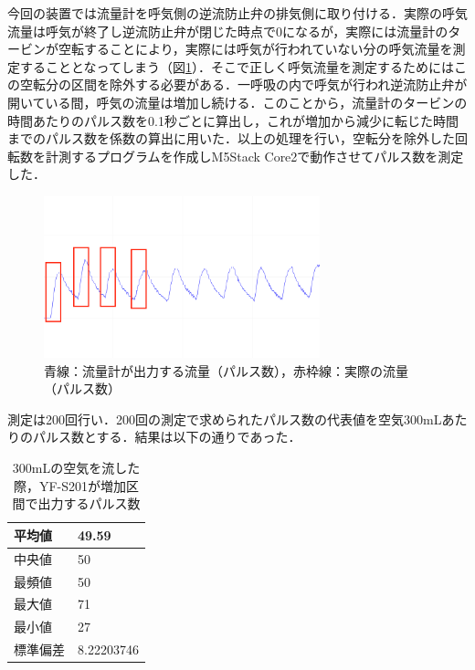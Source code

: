 今回の装置では流量計を呼気側の逆流防止弁の排気側に取り付ける．実際の呼気流量は呼気が終了し逆流防止弁が閉じた時点で0になるが，実際には流量計のタービンが空転することにより，実際には呼気が行われていない分の呼気流量を測定することとなってしまう（図\ref{fig:flowsensor_increased_section}）．そこで正しく呼気流量を測定するためにはこの空転分の区間を除外する必要がある．一呼吸の内で呼気が行われ逆流防止弁が開いている間，呼気の流量は増加し続ける．このことから，流量計のタービンの時間あたりのパルス数を0.1秒ごとに算出し，これが増加から減少に転じた時間までのパルス数を係数の算出に用いた．以上の処理を行い，空転分を除外した回転数を計測するプログラムを作成しM5Stack Core2で動作させてパルス数を測定した．

\begin{figure}[H]
  \begin{center}
    \includegraphics[width=8cm]{fig/flowsensor_increased_section}
    \caption{青線：流量計が出力する流量（パルス数），赤枠線：実際の流量（パルス数）}
    \label{fig:flowsensor_increased_section}
  \end{center}
\end{figure}

測定は200回行い．200回の測定で求められたパルス数の代表値を空気300mLあたりのパルス数とする．結果は以下の通りであった．

\begin{table}[H]
\begin{center}
\caption{300mLの空気を流した際，YF-S201が増加区間で出力するパルス数}
\label{tb:flowsensor_result}
\begin{tabular}{|l|l|}
\hline
平均値  & 49.59      \\ \hline
中央値  & 50         \\ \hline
最頻値  & 50         \\ \hline
最大値  & 71         \\ \hline
最小値  & 27         \\ \hline
標準偏差 & 8.22203746 \\ \hline
\end{tabular}
\end{center}
\end{table}

